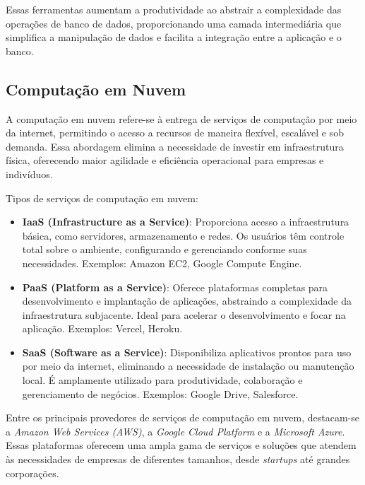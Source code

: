 Essas ferramentas aumentam a produtividade ao abstrair a complexidade das operações de banco de dados, proporcionando uma camada intermediária que simplifica a manipulação de dados e facilita a integração entre a aplicação e o banco.

\subsection{Computação em Nuvem}


A computação em nuvem refere-se à entrega de serviços de computação por meio da internet, permitindo o acesso a recursos de maneira flexível, escalável e sob demanda. Essa abordagem elimina a necessidade de investir em infraestrutura física, oferecendo maior agilidade e eficiência operacional para empresas e indivíduos.

Tipos de serviços de computação em nuvem:

\begin{itemize}
    \item \textbf{IaaS (Infrastructure as a Service)}: Proporciona acesso a infraestrutura básica, como servidores, armazenamento e redes. Os usuários têm controle total sobre o ambiente, configurando e gerenciando conforme suas necessidades. Exemplos: Amazon EC2, Google Compute Engine.
    \item \textbf{PaaS (Platform as a Service)}: Oferece plataformas completas para desenvolvimento e implantação de aplicações, abstraindo a complexidade da infraestrutura subjacente. Ideal para acelerar o desenvolvimento e focar na aplicação. Exemplos: Vercel, Heroku.
    \item \textbf{SaaS (Software as a Service)}: Disponibiliza aplicativos prontos para uso por meio da internet, eliminando a necessidade de instalação ou manutenção local. É amplamente utilizado para produtividade, colaboração e gerenciamento de negócios. Exemplos: Google Drive, Salesforce.
\end{itemize}

Entre os principais provedores de serviços de computação em nuvem, destacam-se a \emph{Amazon Web Services (AWS)}, a \emph{Google Cloud Platform} e a \emph{Microsoft Azure}. Essas plataformas oferecem uma ampla gama de serviços e soluções que atendem às necessidades de empresas de diferentes tamanhos, desde \emph{startups} até grandes corporações.

